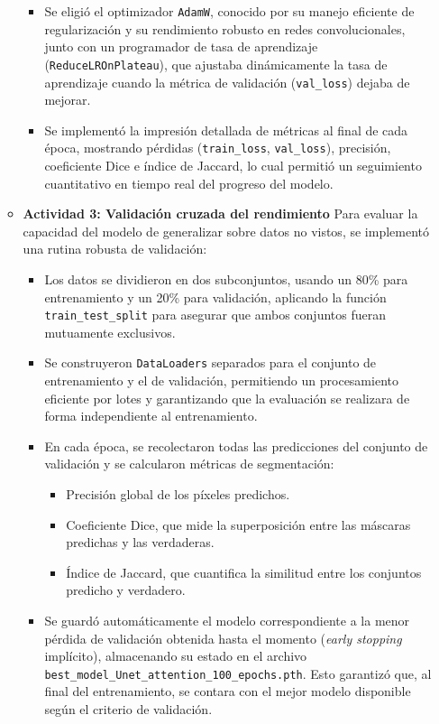 \begin{enumerate}
\begin{itemize}
\begin{itemize}
\item Se eligió el optimizador \texttt{AdamW}, conocido por su manejo eficiente de regularización y su rendimiento robusto en redes convolucionales, junto con un programador de tasa de aprendizaje (\texttt{ReduceLROnPlateau}), que ajustaba dinámicamente la tasa de aprendizaje cuando la métrica de validación (\texttt{val\_loss}) dejaba de mejorar.

\item Se implementó la impresión detallada de métricas al final de cada época, mostrando pérdidas (\texttt{train\_loss}, \texttt{val\_loss}), precisión, coeficiente Dice e índice de Jaccard, lo cual permitió un seguimiento cuantitativo en tiempo real del progreso del modelo.
\end{itemize}


  \item\textbf{Actividad 3: Validación cruzada del rendimiento}
  Para evaluar la capacidad del modelo de generalizar sobre datos no vistos, se implementó una rutina robusta de validación:
\begin{itemize}
\item Los datos se dividieron en dos subconjuntos, usando un 80\% para entrenamiento y un 20\% para validación, aplicando la función \texttt{train\_test\_split} para asegurar que ambos conjuntos fueran mutuamente exclusivos.
\item Se construyeron \texttt{DataLoaders} separados para el conjunto de entrenamiento y el de validación, permitiendo un procesamiento eficiente por lotes y garantizando que la evaluación se realizara de forma independiente al entrenamiento.
\item En cada época, se recolectaron todas las predicciones del conjunto de validación y se calcularon métricas de segmentación:
  \begin{itemize}
  \item Precisión global de los píxeles predichos.
  \item Coeficiente Dice, que mide la superposición entre las máscaras predichas y las verdaderas.
  \item Índice de Jaccard, que cuantifica la similitud entre los conjuntos predicho y verdadero.
  \end{itemize}
\item Se guardó automáticamente el modelo correspondiente a la menor pérdida de validación obtenida hasta el momento (\emph{early stopping} implícito), almacenando su estado en el archivo \texttt{best\_model\_Unet\_attention\_100\_epochs.pth}. Esto garantizó que, al final del entrenamiento, se contara con el mejor modelo disponible según el criterio de validación.
\end{itemize}


\end{itemize}
\end{enumerate}
